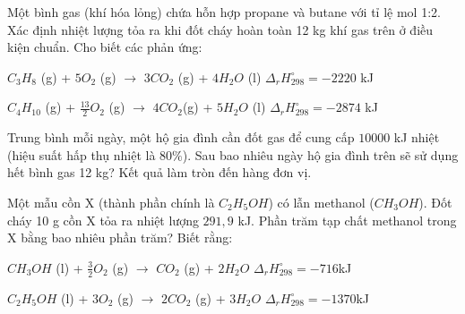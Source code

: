 \documentclass[Main.tex]{subfiles}
\begin{document}
	\begin{bt}
		 Một bình gas (khí hóa lỏng) chứa hỗn hợp propane và butane với tỉ lệ mol 1:2. Xác định nhiệt lượng tỏa ra khi đốt cháy hoàn toàn 12 kg khí gas trên ở điều kiện chuẩn.
		Cho biết các phản ứng:
		
		$C_3H_8$ (g) + $5O_2$ (g) $\longrightarrow$ $3CO_2$ (g) + $4H_2O$ (l)  $\Delta_r H_{298}^\circ = -2220$ kJ
		
		$C_4H_{10}$ (g) + $\frac{13}{2}O_2$ (g) $\longrightarrow$ $4CO_2$(g) + $5H_2O$ (l)  $\Delta_r H_{298}^\circ = -2874$ kJ
		
		Trung bình mỗi ngày, một hộ gia đình cần đốt gas để cung cấp $10000$ kJ nhiệt (hiệu suất hấp thụ nhiệt là $80\%$). Sau bao nhiêu ngày hộ gia đình trên sẽ sử dụng hết bình gas 12 kg? Kết quả làm tròn đến hàng đơn vị.
	\end{bt}
	
	\begin{bt}
		 Một mẫu cồn X (thành phần chính là $C_2H_5OH$) có lẫn methanol ($CH_3OH$). Đốt cháy 10 g cồn X tỏa ra nhiệt lượng $291{,}9$ kJ. Phần trăm tạp chất methanol trong X bằng bao nhiêu phần trăm? Biết rằng:
		
		$CH_3OH$ (l) + $\frac{3}{2}O_2$ (g) $\longrightarrow$ $CO_2$ (g) + $2H_2O$   $\Delta_r H_{298}^\circ = -716$kJ
		
		$C_2H_5OH$ (l) + $3O_2$ (g) $\longrightarrow$ $2CO_2$ (g) + $3H_2O$   $\Delta_r H_{298}^\circ = -1370$kJ
	\end{bt}
	
\end{document}

